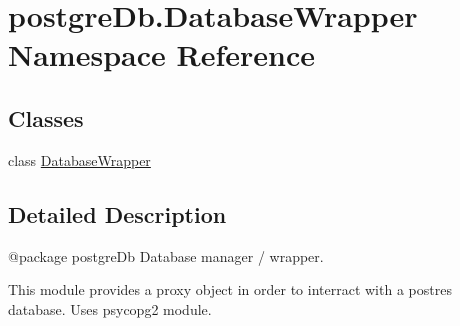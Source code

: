 \hypertarget{namespacepostgreDb_1_1DatabaseWrapper}{}\section{postgre\+Db.\+Database\+Wrapper Namespace Reference}
\label{namespacepostgreDb_1_1DatabaseWrapper}
\subsection*{Classes}
\begin{DoxyCompactItemize}
\item 
class \hyperlink{classpostgreDb_1_1DatabaseWrapper_1_1DatabaseWrapper}{Database\+Wrapper}
\end{DoxyCompactItemize}


\subsection{Detailed Description}
\begin{DoxyVerb}@package postgreDb
Database manager / wrapper.

This module provides a proxy object in order to interract
with a postres database. Uses psycopg2 module.
\end{DoxyVerb}
 